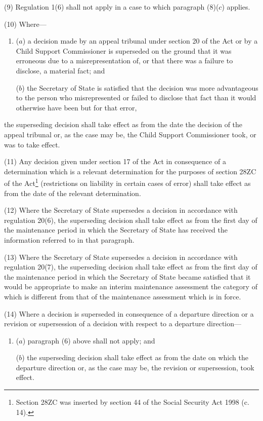 \documentclass[a4paper,12pt]{article}
\begin{document}
(9) Regulation 1(6) shall not apply in a case to which paragraph (8)($c$) applies.

(10) Where---
\begin{enumerate}\item[]
($a$) a decision made by an appeal tribunal under section 20 of the Act or by a Child Support Commissioner is superseded on the ground that it was erroneous due to a misrepresentation of, or that there was a failure to disclose, a material fact; and

($b$) the Secretary of State is satisfied that the decision was more advantageous to the person who misrepresented or failed to disclose that fact than it would otherwise have been but for that error,
\end{enumerate}
the superseding decision shall take effect as from the date the decision of the appeal tribunal or, as the case may be, the Child Support Commissioner took, or was to take effect.

(11) Any decision given under section 17 of the Act in consequence of a determination which is a relevant determination for the purposes of section 28ZC of the Act\footnote{\frenchspacing Section 28ZC was inserted by section 44 of the Social Security Act 1998 (c. 14).} (restrictions on liability in certain cases of error) shall take effect as from the date of the relevant determination.

(12) Where the Secretary of State supersedes a decision in accordance with regulation 20(6), the superseding decision shall take effect as from the first day of the maintenance period in which the Secretary of State has received the information referred to in that paragraph.

(13) Where the Secretary of State supersedes a decision in accordance with regulation 20(7), the superseding decision shall take effect as from the first day of the maintenance period in which the Secretary of State became satisfied that it would be appropriate to make an interim maintenance assessment the category of which is different from that of the maintenance assessment which is in force.

(14) Where a decision is superseded in consequence of a departure direction or a revision or supersession of a decision with respect to a departure direction---
\begin{enumerate}\item[]
($a$) paragraph (6) above shall not apply; and

($b$) the superseding decision shall take effect as from the date on which the departure direction or, as the case may be, the revision or supersession, took effect.
\end{enumerate}
\end{document}
